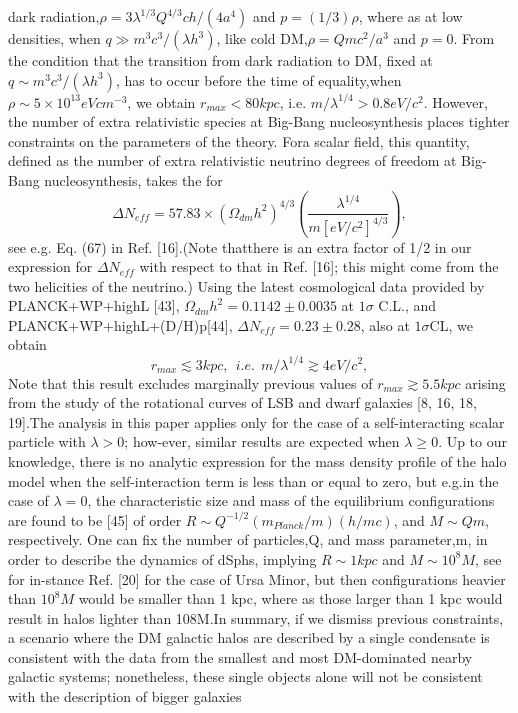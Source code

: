 \documentclass{article}
\begin{document}
\begin{multicols}{2}
dark radiation,$\rho= 3\lambda^{1/3}Q^{4/3}ch/(4a^4)$ and $p= (1/3)\rho$, where as  at  low  densities,  when $q\gg m^3c^3/(\lambda h^3)$,  like cold DM,$\rho=Qmc^2/a^3$ and $p= 0$.  From the condition that the transition from dark radiation to DM, fixed at $q\sim m^3c^3/(\lambda h^3)$, has to occur before the time of equality,when $\rho \sim 5×10^{13}eVcm^{−3}$,  we  obtain $r_{max}<80kpc$, i.e. $m/\lambda^{1/4}>0.8eV/c^2$.   However,  the  number  of  extra relativistic species at Big-Bang nucleosynthesis places tighter constraints on the parameters of the theory.  Fora scalar field, this quantity, defined as the number of extra relativistic neutrino degrees of freedom at Big-Bang nucleosynthesis, takes the for
\begin{equation}
\Delta N_{eff}= {57.83 ×  {(\Omega_{dm}h^2)}^{4/3}}{(\frac{\lambda^{1/4}}{m[eV/c^2]^{4/3}})},   
\end{equation}
see   e.g. Eq.   (67)   in   Ref.   [16].(Note   thatthere   is   an   extra   factor   of   1/2   in   our   expression for  $\Delta N_{eff}$ with   respect   to   that   in Ref.   [16];   this might   come   from   the   two   helicities   of   the   neutrino.)   Using  the  latest  cosmological  data  provided  by PLANCK+WP+highL  [43], $\Omega_{dm}h^2=  0.1142±0.0035$ at  $1\sigma$ C.L.,  and  PLANCK+WP+highL+(D/H)p[44], $\Delta N_{eff}= 0.23±0.28$, also at $1\sigma$CL, we obtain
\begin{equation}
r_{max}\lesssim3kpc,~~i.e.~~m/\lambda^{1/4}\gtrsim4eV/c^2, 
\end{equation}
Note that this result excludes marginally previous values of $r_{max}\gtrsim5.5kpc$ arising from the study of the rotational curves of LSB and dwarf galaxies [8, 16, 18, 19].The  analysis  in  this  paper  applies  only  for  the  case of  a  self-interacting  scalar  particle  with $\lambda >0$;  how-ever,  similar  results  are  expected  when $\lambda\geq0$.   Up  to our  knowledge,  there  is  no  analytic  expression  for  the mass  density  profile  of  the  halo  model  when  the  self-interaction  term  is  less  than  or  equal  to  zero,  but  e.g.in  the  case  of $\lambda= 0$,  the  characteristic  size  and  mass of the equilibrium configurations are found to be [45] of order $R\sim Q^{−1/2}(m_{Planck}/m)(h/mc)$, and $M\sim Qm$, respectively.  One can fix the number of particles,Q, and mass parameter,m, in order to describe the dynamics of dSphs, implying $R\sim1kpc$ and $M\sim10^8M$, see for in-stance Ref. [20] for the case of Ursa Minor, but then configurations heavier than $10^8M$ would be smaller than 1 kpc,  where as  those  larger  than  1 kpc  would  result  in halos lighter than 108M.In summary, if we dismiss previous constraints, a scenario  where  the  DM  galactic  halos  are  described  by  a single  condensate  is  consistent  with  the  data  from  the smallest  and  most  DM-dominated  nearby  galactic  systems; nonetheless, these single objects alone will not be consistent with the description of bigger galaxies

\end{multicols}


\end{document}

